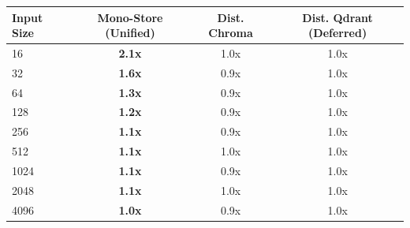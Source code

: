 \begin{tabular}{lccc}
\toprule
\textbf{Input Size} & \textbf{Mono-Store (Unified)} & \textbf{Dist. Chroma} & \textbf{Dist. Qdrant (Deferred)} \\
\midrule
16 & \textbf{2.1x} & 1.0x & 1.0x \\
32 & \textbf{1.6x} & 0.9x & 1.0x \\
64 & \textbf{1.3x} & 0.9x & 1.0x \\
128 & \textbf{1.2x} & 0.9x & 1.0x \\
256 & \textbf{1.1x} & 0.9x & 1.0x \\
512 & \textbf{1.1x} & 1.0x & 1.0x \\
1024 & \textbf{1.1x} & 0.9x & 1.0x \\
2048 & \textbf{1.1x} & 1.0x & 1.0x \\
4096 & \textbf{1.0x} & 0.9x & 1.0x \\
\bottomrule
\end{tabular}
